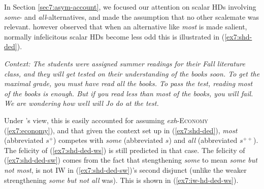 In Section \ref{sec7:asym-account}, we focused our attention on scalar HDs involving \textit{some}- and \textit{all}-alternatives, and made the assumption that no other scalemate was relevant. \textcite{Fox2018} however observed that when an alternative like \textit{most} is made salient, normally infelicitous scalar HDs become less odd this is illustrated in (\ref{ex7:shd-ded}).

\begin{exe}
	\ex\label{ex7:shd-ded} \textit{Context: The students were assigned summer readings for their Fall literature class, and they will get tested on their understanding of the books soon. To get the maximal grade, you must have read all the books. To pass the test, reading most of the books is enough. But if you read less than most of the books, you will fail. We are wondering how well will Jo do at the test.}
	\begin{xlist}
		\label{ex7:shd-ded-ws}
		\label{ex7:shd-ded-sw}
	\end{xlist}
\end{exe}

Under \textcite{Fox2018}'s view, this is easily accounted for assuming \textit{exh}-\textsc{Economy} (\ref{ex7:economy}), and that given the context set up in (\ref{ex7:shd-ded}), \textit{most} (abbreviated $s^+$) competes with \textit{some} (abbreviated $s$) and \textit{all} (abbreviated $s^{++}$). The felicity of (\ref{ex7:shd-ded-ws}) is still predicted in that case. The felicity of (\ref{ex7:shd-ded-sw}) comes from the fact that stengthening \textit{some} to mean \textit{some but not most}, is not IW in  (\ref{ex7:shd-ded-sw})'s second disjunct (unlike the weaker strengthening \textit{some but not all} was). This is shown in (\ref{ex7:iw-hd-ded-ws}).

